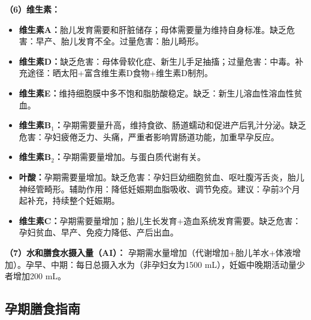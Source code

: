 \begin{keybox}
\textbf{（6）维生素：}

\begin{itemize}[leftmargin=*]
    \item \textbf{维生素A：}胎儿发育需要和肝脏储存；母体需要量为维持自身标准。缺乏危害：早产、胎儿发育不全。过量危害：胎儿畸形。

    \item \textbf{维生素D：}缺乏危害：母体骨软化症、新生儿手足抽搐；过量危害：中毒。补充途径：晒太阳+富含维生素D食物+维生素D制剂。

    \item \textbf{维生素E：}维持细胞膜中多不饱和脂肪酸稳定。缺乏：新生儿溶血性溶血性贫血。

    \item \textbf{维生素B$_{1}$：}孕期需要量升高，维持食欲、肠道蠕动和促进产后乳汁分泌。缺乏危害：孕妇疲倦乏力、头痛，严重者影响胃肠道功能，加重早孕反应。

    \item \textbf{维生素B$_{2}$：}孕期需要量增加。与蛋白质代谢有关。

    \item \textbf{叶酸：}孕期需要量增加。缺乏危害：孕妇巨幼细胞贫血、呕吐腹泻舌炎，胎儿神经管畸形。辅助作用：降低妊娠期血脂吸收、调节免疫。建议：孕前3个月起补充，持续整个妊娠期。

    \item \textbf{维生素C：}孕期需要量增加；胎儿生长发育+造血系统发育需要。缺乏危害：孕妇贫血、早产、免疫力降低、产后出血。
\end{itemize}

\textbf{（7）水和膳食水摄入量（AI）：}
孕期需水量增加（代谢增加+胎儿羊水+体液增加）。孕早、中期：每日总摄入水为（非孕妇女为1500 mL），妊娠中晚期活动量少者增加200 mL。
\end{keybox}

\subsection{孕期膳食指南}

